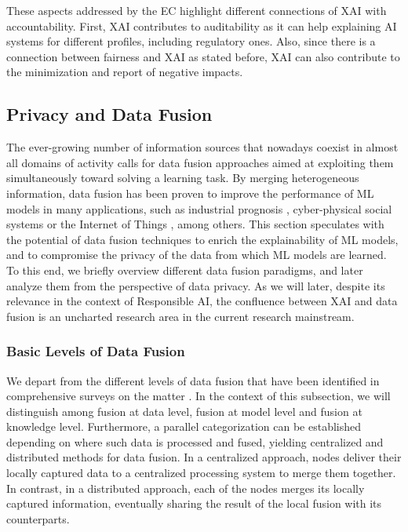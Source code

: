 \documentclass[final]{elsarticle}
\begin{document}
These aspects addressed by the EC highlight different connections of XAI with accountability. First, XAI contributes to auditability as it can help explaining AI systems for different profiles, including regulatory ones. Also, since there is a connection between fairness and XAI as stated before, XAI can also contribute to the minimization and report of negative impacts.

\subsection{Privacy and Data Fusion} \label{ssec:privacydatafusion}

The ever-growing number of information sources that nowadays coexist in almost all domains of activity calls for data fusion approaches aimed at exploiting them simultaneously toward solving a learning task. By merging heterogeneous information, data fusion has been proven to improve the performance of ML models in many applications{\color{black}, such as industrial prognosis \cite{diez2019data}, cyber-physical social systems \cite{wang2019data} or the Internet of Things \cite{ding2019survey}, among others}. This section speculates with the potential of data fusion techniques to enrich the explainability of ML models, and to compromise the privacy of the data from which ML models are learned. To this end, we briefly overview different data fusion paradigms, and later analyze them from the perspective of data privacy. As we will later, despite its relevance in the context of Responsible AI, the confluence between XAI and data fusion is an uncharted research area in the current research mainstream. 

\subsubsection{Basic Levels of Data Fusion} \label{sssec:levels_data_fusion}

We depart from the different levels of data fusion that have been identified in comprehensive surveys on the matter \cite{SMIRNOV201931,DING2019129,WANG201942,LAU2019357}. In the context of this subsection, we will distinguish among fusion at data level, fusion at model level and fusion at knowledge level. Furthermore, a parallel categorization can be established depending on where such data is processed and fused, yielding centralized and distributed methods for data fusion. In a centralized approach, nodes deliver their locally captured data to a centralized processing system to merge them together. In contrast, in a distributed approach, each of the nodes merges its locally captured information, eventually sharing the result of the local fusion with its counterparts.
\end{document}
